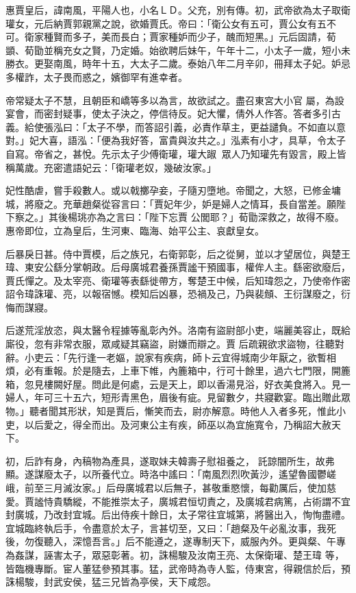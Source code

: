 \begin{pinyinscope}
 惠賈皇后，諱南風，平陽人也，小名ＬＤ。父充，別有傳。初，武帝欲為太子取衛瓘女，元后納賈郭親黨之說，欲婚賈氏。帝曰：「衛公女有五可，賈公女有五不可。衛家種賢而多子，美而長白；賈家種妒而少子，醜而短黑。」元后固請，荀顗、荀勖並稱充女之賢，乃定婚。始欲聘后妹午，午年十二，小太子一歲，短小未勝衣。更娶南風，時年十五，大太子二歲。泰始八年二月辛卯，冊拜太子妃。妒忌多權詐，太子畏而惑之，嬪御罕有進幸者。



 帝常疑太子不慧，且朝臣和嶠等多以為言，故欲試之。盡召東宮大小官
 屬，為設宴會，而密封疑事，使太子決之，停信待反。妃大懼，倩外人作答。答者多引古義。給使張泓曰：「太子不學，而答詔引義，必責作草主，更益譴負。不如直以意對。」妃大喜，語泓：「便為我好答，富貴與汝共之。」泓素有小才，具草，令太子自寫。帝省之，甚悅。先示太子少傅衛瓘，瓘大踧，眾人乃知瓘先有毀言，殿上皆稱萬歲。充密遣語妃云：「衛瓘老奴，幾破汝家。」



 妃性酷虐，嘗手殺數人。或以戟擲孕妾，子隨刃墮地。帝聞之，大怒，已修金墉城，將廢之。充華趙粲從容言曰：「賈妃年少，妒是婦人之情耳，長自當差。願陛下察之。」其後楊珧亦為之言曰：「陛下忘賈
 公閭耶？」荀勖深救之，故得不廢。惠帝即位，立為皇后，生河東、臨海、始平公主、哀獻皇女。



 后暴戾日甚。侍中賈模，后之族兄，右衛郭彰，后之從舅，並以才望居位，與楚王瑋、東安公繇分掌朝政。后母廣城君養孫賈謐干預國事，權侔人主。繇密欲廢后，賈氏憚之。及太宰亮、衛瓘等表繇徙帶方，奪楚王中候，后知瑋怨之，乃使帝作密詔令瑋誅瓘、亮，以報宿憾。模知后凶暴，恐禍及己，乃與裴頠、王衍謀廢之，衍悔而謀寢。



 后遂荒淫放恣，與太醫令程據等亂彰內外。洛南有盜尉部小吏，端麗美容止，既給廝役，忽有非常衣服，眾咸疑其竊盜，尉嫌而辯之。賈
 后疏親欲求盜物，往聽對辭。小吏云：「先行逢一老嫗，說家有疾病，師卜云宜得城南少年厭之，欲暫相煩，必有重報。於是隨去，上車下帷，內簏箱中，行可十餘里，過六七門限，開簏箱，忽見樓闕好屋。問此是何處，云是天上，即以香湯見浴，好衣美食將入。見一婦人，年可三十五六，短形青黑色，眉後有疵。見留數夕，共寢歡宴。臨出贈此眾物。」聽者聞其形狀，知是賈后，慚笑而去，尉亦解意。時他人入者多死，惟此小吏，以后愛之，得全而出。及河東公主有疾，師巫以為宜施寬令，乃稱詔大赦天下。



 初，后詐有身，內稿物為產具，遂取妹夫韓壽子慰祖養之，
 託諒闇所生，故弗顯。遂謀廢太子，以所養代立。時洛中謠曰：「南風烈烈吹黃沙，遙望魯國鬱嵯峨，前至三月滅汝家。」后母廣城君以后無子，甚敬重愍懷，每勸厲后，使加慈愛。賈謐恃貴驕縱，不能推崇太子，廣城君恒切責之，及廣城君病篤，占術謂不宜封廣城，乃改封宜城。后出侍疾十餘日，太子常往宜城第，將醫出入，恂恂盡禮。宜城臨終執后手，令盡意於太子，言甚切至，又曰：「趙粲及午必亂汝事，我死後，勿復聽入，深憶吾言。」后不能遵之，遂專制天下，威服內外。更與粲、午專為姦謀，誣害太子，眾惡彰著。初，誅楊駿及汝南王亮、太保衛瓘、楚王瑋
 等，皆臨機專斷。宦人董猛參預其事。猛，武帝時為寺人監，侍東宮，得親信於后，預誅楊駿，封武安侯，猛三兄皆為亭侯，天下咸怨。




\end{pinyinscope}
